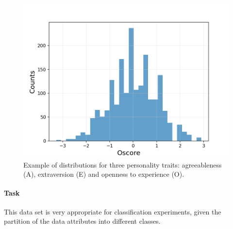 \documentclass{article}
\begin{document}
\begin{figure}[h!]
\begin{minipage}[b]{0.32\textwidth}
	\end{minipage}
	\begin{minipage}[b]{0.32\textwidth}
		\includegraphics[width=\textwidth]{plots/drugsPlots/Oscore.png}
	\end{minipage}
	\caption{Example of distributions for three personality traits:  agreeableness (A), extraversion (E) and openness to experience (O).}
	\label{drugs3}
\end{figure}



\paragraph{Task}

This data set is very appropriate for classification experiments, given the partition of the data attributes into different classes.



\newpage
{}

\end{document}
